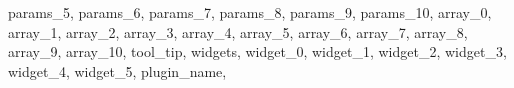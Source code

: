 {{                        params_5,
                        params_6,
                        params_7,
                        params_8,
                        params_9,
                        params_10,
                        array_0,
                        array_1,
                        array_2,
                        array_3,
                        array_4,
                        array_5,
                        array_6,
                        array_7,
                        array_8,
                        array_9,
                        array_10,
                            tool_tip,
                widgets,
                    widget_0,
                    widget_1,
                    widget_2,
                    widget_3,
                    widget_4,
                    widget_5,
                        plugin_name,
        }
    }
    